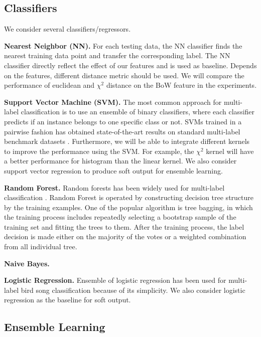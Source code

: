 \documentclass{article} %
\begin{document}
\subsection{Classifiers}
We consider several classifiers/regressors.

\textbf{Nearest Neighbor (NN).} For each testing data, the NN classifier finds the nearest training data point and transfer the corresponding label. The NN classifier directly reflect the effect of our features and is used as baseline. Depends on the features, different distance metric should be used. We will compare the performance of euclidean and $\chi^2$ distance on the BoW feature in the experiments.

\textbf{Support Vector Machine (SVM).} The most common approach for multi-label classification is to use an ensemble of binary classifiers, where each classifier predicts if an instance belongs to
one specific class or not. SVMs trained in a pairwise fashion has obtained state-of-the-art results on standard multi-label benchmark datasets \cite{Mencia_NIPSW13}. Furthermore, we will be able to integrate different kernels to improve the performance using the SVM. For example, the $\chi^2$ kernel will have a better performance for histogram than the linear kernel. We also consider support vector regression to produce soft output for ensemble learning.


\textbf{Random Forest.} Random forests has been widely used for multi-label classification \cite{Lasseck13, chennovel13, Stowell_NIPSW13, Zhang_SDM2010}.
Random Forest is operated by constructing decision tree structure by the training examples. One of the popular algorithm is tree bagging, in which the training process includes repeatedly selecting a bootstrap sample of the training set and  fitting the trees to them. After the training process, the label decision is made either on the majority of the votes or a weighted combination from all individual tree.

\textbf{Naive Bayes.} 

\textbf{Logistic Regression.} Ensemble of logistic regression has been used for multi-label bird song classification \cite{Massaron13} because of its simplicity. We also consider logistic regression as the baseline for soft output.

\subsection{Ensemble Learning}
\end{document}
